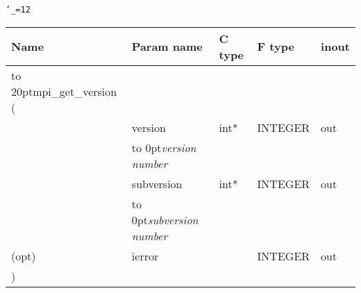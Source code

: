 \begingroup\tt\catcode`\_=12
\begin{tabular}{lllll}
\toprule
\textrm{Name}&\textrm{Param name}&\textrm{C type}&\textrm{F type}&\textrm{inout}\\
\midrule
\hbox to 20pt{mpi_get_version (\hss} \\
&version&int*&INTEGER&out\\ [-3pt]
&\hbox to 0pt{\footnotesize\sl version number\hss}\\
&subversion&int*&INTEGER&out\\ [-3pt]
&\hbox to 0pt{\footnotesize\sl subversion number\hss}\\
(opt)&ierror&&INTEGER&out\\
)\\
\bottomrule
\end{tabular}
\endgroup

